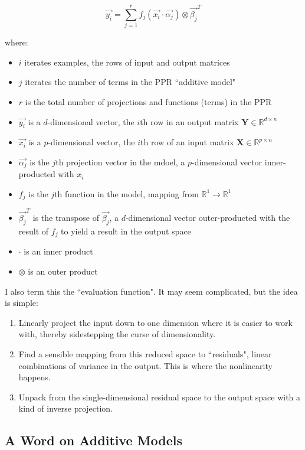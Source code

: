 \documentclass[12pt]{article}
\begin{document}
$$\vec{y_i} = \sum_{j=1}^{r} f_j(\vec{x_i} \cdot \vec{\alpha_j}) \otimes \vec{\beta_j}^T$$

where:
\begin{itemize}
	\setlength\itemsep{-2mm}
	\item $i$ iterates examples, the rows of input and output matrices
	\item $j$ iterates the number of terms in the PPR ``additive model"
	\item $r$ is the total number of projections and functions (terms) in the PPR
	\item $\vec{y_i}$ is a $d$-dimensional vector, the $i$th row in an output matrix $\pmb{Y} \in \mathbb{R}^{d \times n}$
	\item $\vec{x_i}$ is a $p$-dimensional vector, the $i$th row of an input matrix $\pmb{X} \in \mathbb{R}^{p \times n}$
	\item $\vec{\alpha_j}$ is the $j$th projection vector in the mdoel, a $p$-dimensional vector inner-producted with $x_i$
	\item $f_j$ is the $j$th function in the model, mapping from $\mathbb{R}^1 \rightarrow \mathbb{R}^1$
	\item $\vec{\beta_j}^T$ is the transpose of $\vec{\beta_j}$, a $d$-dimensional vector outer-producted with the result of $f_j$ to yield a result in the output space
	\item $\cdot$ is an inner product
	\item $\otimes$ is an outer product
\end{itemize}

I also term this the ``evaluation function". It may seem complicated, but the idea is simple:

\begin{enumerate}
	\setlength\itemsep{-2mm}
	\item Linearly project the input down to one dimension where it is easier to work with, thereby sidestepping the curse of dimensionality.
	\item Find a sensible mapping from this reduced space to ``residuals", linear combinations of variance in the output. This is where the nonlinearity happens.
	\item Unpack from the single-dimensional residual space to the output space with a kind of inverse projection.
\end{enumerate}

\subsection{A Word on Additive Models}
\end{document}
